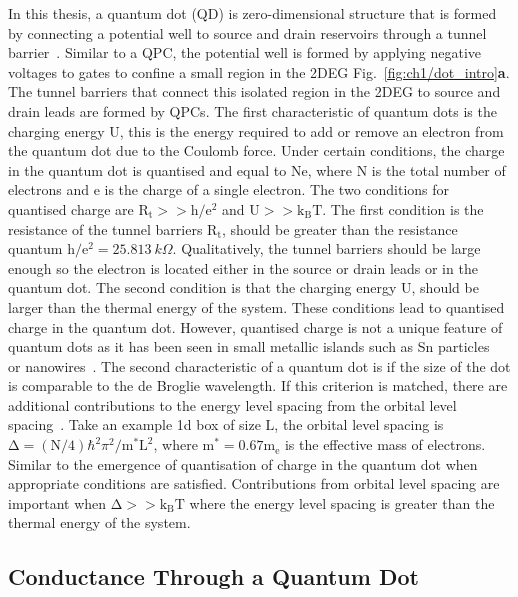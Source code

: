 In this thesis, a quantum dot (QD) is zero-dimensional structure that is formed by connecting a potential well to source and drain reservoirs through a tunnel barrier~\cite{spins_in_qd}. Similar to a QPC, the potential well is formed by applying negative voltages to gates to confine a small region in the 2DEG Fig.~\ref{fig:ch1/dot_intro}\textbf{a}. The tunnel barriers that connect this isolated region in the 2DEG to source and drain leads are formed by QPCs. The first characteristic of quantum dots is the charging energy $\mathrm{U}$, this is the energy required to add or remove an electron from the quantum dot due to the Coulomb force. 
Under certain conditions, the charge in the quantum dot is quantised and equal to $\mathrm{Ne}$, where $\mathrm{N}$ is the total number of electrons and $\mathrm{e}$ is the charge of a single electron. The two conditions for quantised charge are $\mathrm{R_t}>>\mathrm{h/e^2}$ and $\mathrm{U}>>\mathrm{k_BT}$. The first condition is the resistance of the tunnel barriers $\mathrm{R_t}$, should be greater than the resistance quantum $\mathrm{h/e^2}=\qty{25.813}{k\Omega}$. Qualitatively, the tunnel barriers should be large enough so the electron is located either in the source or drain leads or in the quantum dot. The second condition is that the charging energy $\mathrm{U}$, should be larger than the thermal energy of the system. These conditions lead to quantised charge in the quantum dot. However, quantised charge is not a unique feature of quantum dots as it has been seen in small metallic islands such as Sn particles~\cite{first_quantised_charge} or nanowires~\cite{nanowire_quantisedcharge}.
The second characteristic of a quantum dot is if the size of the dot is comparable to the de Broglie wavelength. If this criterion is matched, there are additional contributions to the energy level spacing from the orbital level spacing~\cite{Kouwenhoven_1997_electron_transport}. Take an example 1d box of size $\mathrm{L}$, the orbital level spacing is $\mathrm{\Delta}=(\mathrm{N}/4)\hbar^2\pi^2 / \mathrm{m^*L^2}$, where $\mathrm{m^*}=0.67\mathrm{m_e}$ is the effective mass of electrons. Similar to the emergence of quantisation of charge in the quantum dot when appropriate conditions are satisfied. Contributions from orbital level spacing are important when $\mathrm{\Delta}>>\mathrm{k_BT}$ where the energy level spacing is greater than the thermal energy of the system. 

\afterpage{\clearpage}
\subsection{Conductance Through a Quantum Dot}


